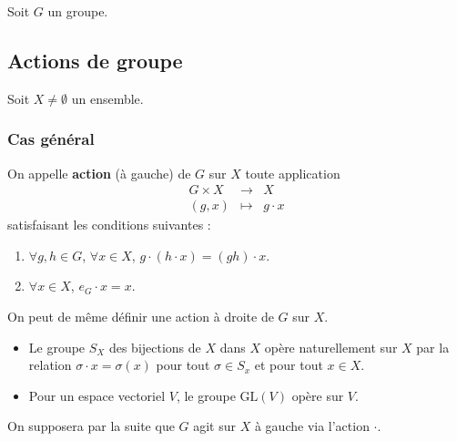 




	Soit $G$ un groupe.

	\subsection{Actions de groupe}

	Soit $X \neq \emptyset$ un ensemble.

	\subsubsection{Cas général}


	\begin{definition}
		On appelle \textbf{action} (à gauche) de $G$ sur $X$ toute application
		\[
		\begin{array}{ccc}
			G \times X &\rightarrow& X \\
			(g, x) &\mapsto& g \cdot x
		\end{array}
		\]
		satisfaisant les conditions suivantes :
		\begin{enumerate}[label=(\roman*)]
			\item $\forall g, h \in G$, $\forall x \in X$, $g \cdot (h \cdot x) = (gh) \cdot x$.
			\item $\forall x \in X$, $e_G \cdot x = x$.
		\end{enumerate}
	\end{definition}

	\begin{remark}
		On peut de même définir une action à droite de $G$ sur $X$.
	\end{remark}

	\begin{example}
		\begin{itemize}
			\item Le groupe $S_X$ des bijections de $X$ dans $X$ opère naturellement sur $X$ par la relation $\sigma \cdot x = \sigma(x)$ pour tout $\sigma \in S_x$ et pour tout $x \in X$.
			\item Pour un espace vectoriel $V$, le groupe $\mathrm{GL}(V)$ opère sur $V$.
		\end{itemize}
	\end{example}

	On supposera par la suite que $G$ agit sur $X$ à gauche via l'action $\cdot$.

